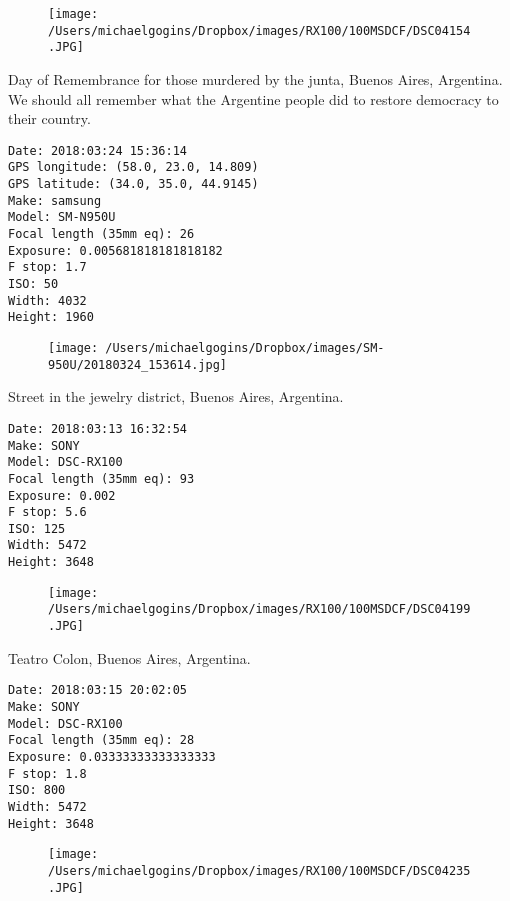 \documentclass[11pt,letter,DIV=14,paper=landscape]{scrbook}
\begin{document}
\begin{figure}
\texttt{[image: /Users/michaelgogins/Dropbox/images/RX100/100MSDCF/DSC04154.JPG]}
\end{figure}
    
\clearpage
\noindent Day of Remembrance for those murdered by the junta, Buenos Aires, Argentina. We should all remember what the Argentine people did to restore democracy to their country.
\noindent
\begin{lstlisting}
Date: 2018:03:24 15:36:14
GPS longitude: (58.0, 23.0, 14.809)
GPS latitude: (34.0, 35.0, 44.9145)
Make: samsung
Model: SM-N950U
Focal length (35mm eq): 26
Exposure: 0.005681818181818182
F stop: 1.7
ISO: 50
Width: 4032
Height: 1960
\end{lstlisting}
\clearpage

\begin{figure}
\texttt{[image: /Users/michaelgogins/Dropbox/images/SM-950U/20180324\_153614.jpg]}
\end{figure}
    
\clearpage
\noindent Street in the jewelry district, Buenos Aires, Argentina.
\noindent
\begin{lstlisting}
Date: 2018:03:13 16:32:54
Make: SONY
Model: DSC-RX100
Focal length (35mm eq): 93
Exposure: 0.002
F stop: 5.6
ISO: 125
Width: 5472
Height: 3648
\end{lstlisting}
\clearpage

\begin{figure}
\texttt{[image: /Users/michaelgogins/Dropbox/images/RX100/100MSDCF/DSC04199.JPG]}
\end{figure}
    
\clearpage
\noindent Teatro Colon, Buenos Aires, Argentina.
\noindent
\begin{lstlisting}
Date: 2018:03:15 20:02:05
Make: SONY
Model: DSC-RX100
Focal length (35mm eq): 28
Exposure: 0.03333333333333333
F stop: 1.8
ISO: 800
Width: 5472
Height: 3648
\end{lstlisting}
\clearpage

\begin{figure}
\texttt{[image: /Users/michaelgogins/Dropbox/images/RX100/100MSDCF/DSC04235.JPG]}
\end{figure}
    
\end{document}
